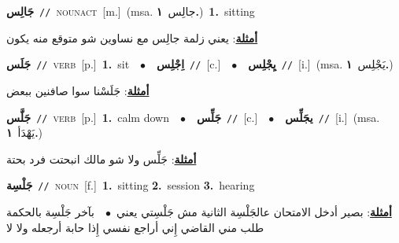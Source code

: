 \documentclass[10pt,a4paper,twoside]{article} %
\begin{document}
\begin{multicols}{2}
{\setlength\topsep{0pt}\textbf{\foreignlanguage{arabic}{جَالِس}}\ {\color{gray}\texttt{//}\color{black}}\ \textsc{noun\textunderscore act}\ [m.]\ \color{gray}(msa. \foreignlanguage{arabic}{جالِس}~\foreignlanguage{arabic}{\textbf{١.}})\color{black}\ \textbf{1.}~sitting\  \begin{flushright}\color{gray}\foreignlanguage{arabic}{\textbf{\underline{\foreignlanguage{arabic}{أمثلة}}}: يعني زلمة جالِس مع نساوين شو متوقع منه يكون}\end{flushright}\color{black}} \vspace{2mm}

{\setlength\topsep{0pt}\textbf{\foreignlanguage{arabic}{جَلَس}}\ {\color{gray}\texttt{//}\color{black}}\ \textsc{verb}\ [p.]\ \textbf{1.}~sit\ \ $\bullet$\ \ \setlength\topsep{0pt}\textbf{\foreignlanguage{arabic}{اِجْلِس}}\ {\color{gray}\texttt{//}\color{black}}\ [c.]\ \ $\bullet$\ \ \setlength\topsep{0pt}\textbf{\foreignlanguage{arabic}{يِجْلِس}}\ {\color{gray}\texttt{//}\color{black}}\ [i.]\ \color{gray}(msa. \foreignlanguage{arabic}{يَجْلِس}~\foreignlanguage{arabic}{\textbf{١.}})\color{black}\  \begin{flushright}\color{gray}\foreignlanguage{arabic}{\textbf{\underline{\foreignlanguage{arabic}{أمثلة}}}: جَلَسْنا سوا صافنين ببعض}\end{flushright}\color{black}} \vspace{2mm}

{\setlength\topsep{0pt}\textbf{\foreignlanguage{arabic}{جَلَّس}}\ {\color{gray}\texttt{//}\color{black}}\ \textsc{verb}\ [p.]\ \textbf{1.}~calm down\ \ $\bullet$\ \ \setlength\topsep{0pt}\textbf{\foreignlanguage{arabic}{جَلِّس}}\ {\color{gray}\texttt{//}\color{black}}\ [c.]\ \ $\bullet$\ \ \setlength\topsep{0pt}\textbf{\foreignlanguage{arabic}{يجَلِّس}}\ {\color{gray}\texttt{//}\color{black}}\ [i.]\ \color{gray}(msa. \foreignlanguage{arabic}{يَهْدَأ}~\foreignlanguage{arabic}{\textbf{١.}})\color{black}\  \begin{flushright}\color{gray}\foreignlanguage{arabic}{\textbf{\underline{\foreignlanguage{arabic}{أمثلة}}}: جَلِّس ولا شو مالك انبحتت فرد بحتة}\end{flushright}\color{black}} \vspace{2mm}

{\setlength\topsep{0pt}\textbf{\foreignlanguage{arabic}{جَلْسِة}}\ {\color{gray}\texttt{//}\color{black}}\ \textsc{noun}\ [f.]\ \textbf{1.}~sitting  \textbf{2.}~session  \textbf{3.}~hearing\  \begin{flushright}\color{gray}\foreignlanguage{arabic}{\textbf{\underline{\foreignlanguage{arabic}{أمثلة}}}: بصير أدخل الامتحان عالجَلْسِة الثانية مش جَلْسِتي يعني\ $\bullet$\ \  بآخر جَلْسِة بالحكمة طلب مني القاضي إِني أراجع نفسي  إِذا حابة أرجعله ولا لا}\end{flushright}\color{black}} \vspace{2mm}


\end{multicols}
\end{document}
